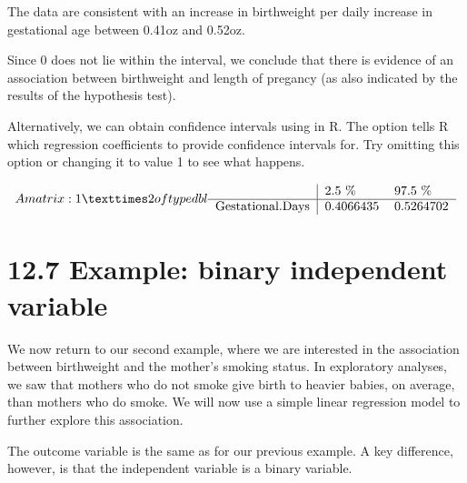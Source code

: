 \documentclass[letterpaper,10pt,english]{jupyterBook}
\begin{document}
\sphinxAtStartPar
The data are consistent with an increase in birthweight per daily increase in gestational age between 0.41oz and 0.52oz.

\sphinxAtStartPar
Since 0 does not lie within the interval, we conclude that there is evidence of an association between birthweight and length of pregancy (as also indicated by the results of the hypothesis test).

\sphinxAtStartPar
Alternatively, we can obtain confidence intervals using  in R. The option  tells R which regression coefficients to provide confidence intervals for. Try omitting this option or changing it to value 1 to see what happens.

\begin{sphinxVerbatim}[commandchars=\\\{\}]
  
\end{sphinxVerbatim}
\begin{equation*}
\begin{split}A matrix: 1 × 2 of type dbl
\begin{tabular}{r|ll}
  & 2.5 \% & 97.5 \%\\
\hline
	Gestational.Days & 0.4066435 & 0.5264702\\
\end{tabular}\end{split}
\end{equation*}

\section{12.7 Example: binary independent variable}
\label{\detokenize{12.h. Linear Regression I:example-binary-independent-variable}}\label{\detokenize{12.h. Linear Regression I::doc}}
\sphinxAtStartPar
We now return to our second example, where we are interested in the association between birthweight and the mother’s smoking status. In exploratory analyses, we saw that  mothers who do not smoke give birth to heavier babies, on average, than mothers who do smoke. We will now use a simple linear regression model to further explore this association.

\sphinxAtStartPar
The outcome variable is the same as for our previous example. A key difference, however, is that the independent variable is a binary variable.
\end{document}

